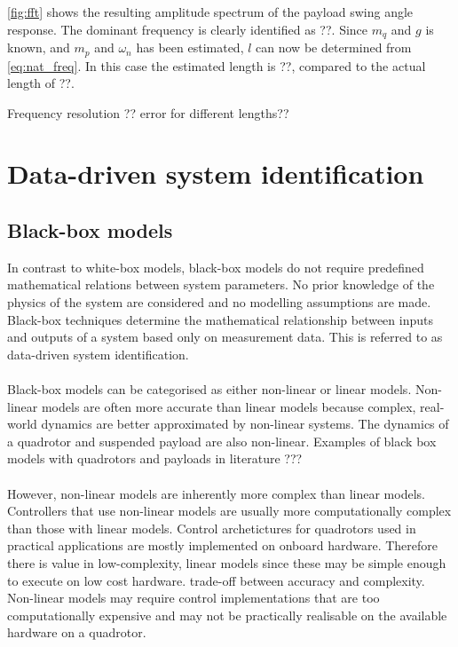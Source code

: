         \ref{fig:fft} 
        shows the resulting amplitude spectrum of the payload swing angle response.
        The dominant frequency is clearly identified as ??.
        Since $m_q$ and $g$ is known, and $m_p$ and $\omega_n$ has been estimated, $l$ can now be determined from
        \ref{eq:nat_freq}.
        In this case the estimated length is ??, compared to the actual length of ??.
        
        Frequency resolution ??
        error for different lengths??

\section{Data-driven system identification}
    \subsection{Black-box models}
        In contrast to white-box models, black-box models do not require predefined mathematical relations between system parameters.
        No prior knowledge of the physics of the system are considered and no modelling assumptions are made.
        Black-box techniques determine the mathematical relationship between inputs and outputs of a system based only on measurement data.
        This is referred to as data-driven system identification.

        \paragraph{}
        Black-box models can be categorised as either non-linear or linear models.
        Non-linear models are often more accurate than linear models because complex, real-world dynamics are better approximated by non-linear systems.
        The dynamics of a quadrotor and suspended payload are also non-linear.
        Examples of black box models with quadrotors and payloads in literature ???

        \paragraph{}
        However, non-linear models are inherently more complex than linear models. 
        Controllers that use non-linear models are usually more computationally complex than those with linear models.
        Control archetictures for quadrotors used in practical applications are mostly implemented on onboard hardware.
        Therefore there is value in low-complexity, linear models since these may be simple enough to execute on low cost hardware.
        trade-off between accuracy and complexity.
        Non-linear models may require control implementations that are too computationally expensive and may not be practically realisable on the available hardware on a quadrotor.

